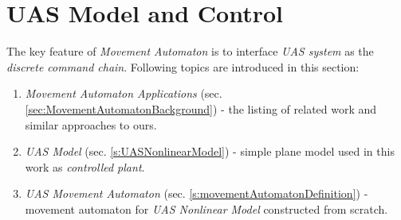 \cleardoublepage
\section{UAS Model and Control}\label{s:modelMAImplementation}

\noindent The key feature of \emph{Movement Automaton} is to interface \emph{UAS system} as the \emph{discrete command chain}. Following topics are introduced in this section:

\begin{enumerate}
	\item \emph{Movement Automaton Applications} (sec. \ref{sec:MovementAutomatonBackground}) - the listing of related work and similar approaches to ours.
	
	
    \item \emph{UAS Model} (sec. \ref{s:UASNonlinearModel}) - simple plane model used in this work as \emph{controlled plant}.
    
    \item \emph{UAS Movement Automaton} (sec. \ref{s:movementAutomatonDefinition}) - movement automaton for \emph{UAS Nonlinear Model} constructed from scratch.
\end{enumerate}









